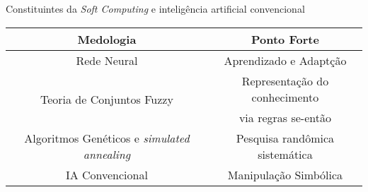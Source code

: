 \begin{quadro}[!htb]
    \centering
    \caption{Constituintes da \textit{Soft Computing} e inteligência artificial convencional\label{qua:Jang1997_sc_constituents}}
    \begin{tabular}{|c|c|}
        \hline
            \textbf{Medologia} & 
            \textbf{Ponto Forte} \\
        \hline
            Rede Neural &
            Aprendizado e Adaptção \\
        \hline
            \multirow{2}{*}{Teoria de Conjuntos Fuzzy}&Representação do conhecimento\\
            &via regras se-então\\
        \hline
            Algoritmos Genéticos e \textit{simulated annealing} &
            Pesquisa randômica sistemática \\



        \hline
            IA Convencional &
            Manipulação Simbólica \\
        \hline
    \end{tabular}
\end{quadro}
